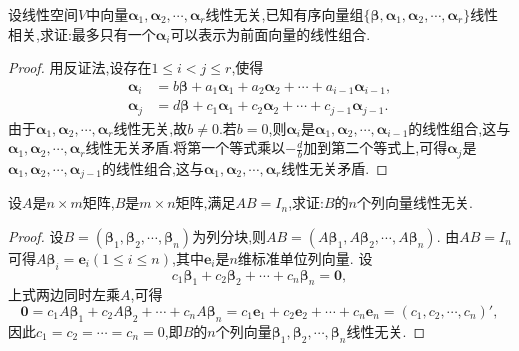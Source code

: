 \documentclass[../../main.tex]{subfiles}%
\begin{document}
\begin{proposition}\label{proposition:线性无关向量组的命题3}
设线性空间\(V\)中向量\(\boldsymbol{\alpha}_1,\boldsymbol{\alpha}_2,\cdots,\boldsymbol{\alpha}_r\)线性无关,已知有序向量组\(\{\boldsymbol{\beta},\boldsymbol{\alpha}_1,\boldsymbol{\alpha}_2,\cdots,\boldsymbol{\alpha}_r\}\)线性相关,求证:最多只有一个\(\boldsymbol{\alpha}_i\)可以表示为前面向量的线性组合.
\end{proposition}
\begin{proof}
用反证法,设存在\(1\leqslant  i<j\leqslant  r\),使得
\begin{align*}
\boldsymbol{\alpha}_i&=b\boldsymbol{\beta}+a_1\boldsymbol{\alpha}_1 + a_2\boldsymbol{\alpha}_2+\cdots + a_{i - 1}\boldsymbol{\alpha}_{i - 1},\\
\boldsymbol{\alpha}_j&=d\boldsymbol{\beta}+c_1\boldsymbol{\alpha}_1 + c_2\boldsymbol{\alpha}_2+\cdots + c_{j - 1}\boldsymbol{\alpha}_{j - 1}.
\end{align*}
由于\(\boldsymbol{\alpha}_1,\boldsymbol{\alpha}_2,\cdots,\boldsymbol{\alpha}_r\)线性无关,故\(b\neq0\).若$b=0$,则\(\boldsymbol{\alpha}_i\)是\(\boldsymbol{\alpha}_1,\boldsymbol{\alpha}_2,\cdots,\boldsymbol{\alpha}_{i - 1}\)的线性组合,这与\(\boldsymbol{\alpha}_1,\boldsymbol{\alpha}_2,\cdots,\boldsymbol{\alpha}_r\)线性无关矛盾.将第一个等式乘以\(-\frac{d}{b}\)加到第二个等式上,可得\(\boldsymbol{\alpha}_j\)是\(\boldsymbol{\alpha}_1,\boldsymbol{\alpha}_2,\cdots,\boldsymbol{\alpha}_{j - 1}\)的线性组合,这与\(\boldsymbol{\alpha}_1,\boldsymbol{\alpha}_2,\cdots,\boldsymbol{\alpha}_r\)线性无关矛盾.
\end{proof}

\begin{proposition}\label{proposition:线性无关向量组的命题4}
设\(A\)是\(n\times m\)矩阵,\(B\)是\(m\times n\)矩阵,满足\(AB = I_n\),求证:\(B\)的\(n\)个列向量线性无关.
\end{proposition}
\begin{proof}
设\(B = (\boldsymbol{\beta}_1,\boldsymbol{\beta}_2,\cdots,\boldsymbol{\beta}_n)\)为列分块,则\(AB=(A\boldsymbol{\beta}_1,A\boldsymbol{\beta}_2,\cdots,A\boldsymbol{\beta}_n)\). 由\(AB = I_n\)可得\(A\boldsymbol{\beta}_i=\boldsymbol{e}_i(1\leqslant  i\leqslant  n)\),其中\(\boldsymbol{e}_i\)是\(n\)维标准单位列向量. 设
\[
c_1\boldsymbol{\beta}_1 + c_2\boldsymbol{\beta}_2+\cdots + c_n\boldsymbol{\beta}_n=\boldsymbol{0},
\]
上式两边同时左乘\(A\),可得
\[
\boldsymbol{0}=c_1A\boldsymbol{\beta}_1 + c_2A\boldsymbol{\beta}_2+\cdots + c_nA\boldsymbol{\beta}_n=c_1\boldsymbol{e}_1 + c_2\boldsymbol{e}_2+\cdots + c_n\boldsymbol{e}_n=(c_1,c_2,\cdots,c_n)',
\]
因此\(c_1 = c_2=\cdots = c_n = 0\),即\(B\)的\(n\)个列向量\(\boldsymbol{\beta}_1,\boldsymbol{\beta}_2,\cdots,\boldsymbol{\beta}_n\)线性无关.
\end{proof}
\end{document}
